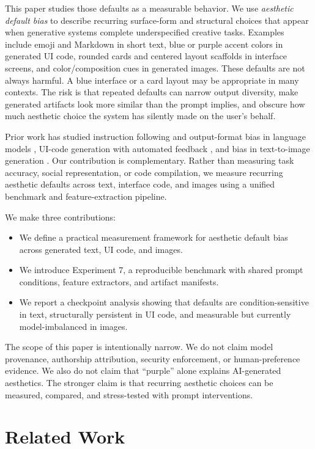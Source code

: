 \documentclass[10pt]{article}
\begin{document}
This paper studies those defaults as a measurable behavior. We use \emph{aesthetic default bias} to describe recurring surface-form and structural choices that appear when generative systems complete underspecified creative tasks. Examples include emoji and Markdown in short text, blue or purple accent colors in generated UI code, rounded cards and centered layout scaffolds in interface screens, and color/composition cues in generated images. These defaults are not always harmful. A blue interface or a card layout may be appropriate in many contexts. The risk is that repeated defaults can narrow output diversity, make generated artifacts look more similar than the prompt implies, and obscure how much aesthetic choice the system has silently made on the user's behalf.

Prior work has studied instruction following and output-format bias in language models \cite{zhou2023ifeval,jiang2024followbench,long2025format}, UI-code generation with automated feedback \cite{wu2024uicoder}, and bias in text-to-image generation \cite{bianchi2022t2i,friedrich2024fairness}. Our contribution is complementary. Rather than measuring task accuracy, social representation, or code compilation, we measure recurring aesthetic defaults across text, interface code, and images using a unified benchmark and feature-extraction pipeline.

We make three contributions:
\begin{itemize}
  \item We define a practical measurement framework for aesthetic default bias across generated text, UI code, and images.
  \item We introduce Experiment 7, a reproducible benchmark with shared prompt conditions, feature extractors, and artifact manifests.
  \item We report a checkpoint analysis showing that defaults are condition-sensitive in text, structurally persistent in UI code, and measurable but currently model-imbalanced in images.
\end{itemize}

The scope of this paper is intentionally narrow. We do not claim model provenance, authorship attribution, security enforcement, or human-preference evidence. We also do not claim that ``purple'' alone explains AI-generated aesthetics. The stronger claim is that recurring aesthetic choices can be measured, compared, and stress-tested with prompt interventions.

\section{Related Work}
\end{document}
